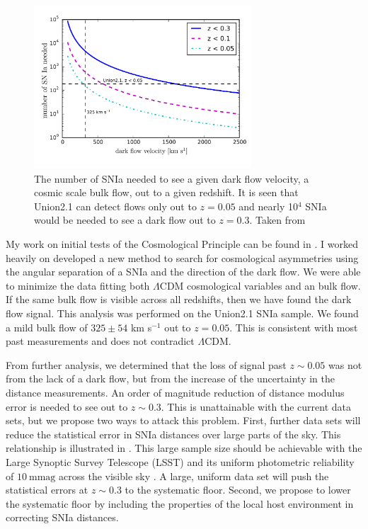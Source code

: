 \documentclass[apj, iop]{emulateapj}
\newcommand{\sn}{SNIa}
\newcommand{\lcdm}{$\Lambda$CDM}     %
\begin{document}
\begin{figure}
	\includegraphics[width=3.2in]{what_dataset_size_v_velocity.pdf} 
    \caption{The number of \sn{} needed to see a given dark flow velocity, a
	cosmic scale bulk flow, out to a given redshift. It is seen that Union2.1 
	can detect flows only out to $z=0.05$ and nearly 10$^4$ \sn{} would be 
	needed to see a dark flow out to $z=0.3$. Taken from \cite{Mathews16}}
	\label{f:sn-needed} 
\end{figure}

My work on initial tests of the Cosmological Principle can be found in
\cite{Mathews16}. I worked heavily on developed a new method to search for
cosmological asymmetries using the angular separation of a \sn{} and the
direction of the dark flow. We were able to minimize the data fitting both
\lcdm{} cosmological variables and  an bulk flow. If the same bulk flow is
visible across all redshifts, then we have found the dark flow signal. This
analysis was performed on the Union2.1 \citep{Suzuki12} \sn{} sample. We found a
mild bulk flow of $325 \pm 54$ km s$^{-1}$ out to $z = 0.05$. This is consistent
with most past measurements and does not contradict \lcdm{}.

From further analysis, we determined that the loss of signal past $z \sim 0.05$
was not from the lack of a dark flow, but from the increase of the uncertainty
in the distance measurements. An order of magnitude reduction of distance
modulus error is needed to see out to $z \sim 0.3$. This is unattainable with
the current data sets, but we propose two ways to attack this problem. First,
further data sets will reduce the statistical error in \sn{} distances over
large parts of the sky. This relationship is illustrated in .
This large sample size should be achievable with the Large Synoptic Survey
Telescope (LSST) and its uniform photometric reliability of $10 ~\text{mmag}$
across the visible sky \citep{Ivezic08}. A large, uniform data set will push the
statistical errors at $z\sim 0.3$ to the systematic floor. Second, we propose to
lower the systematic floor by including the properties of the local host
environment in correcting \sn{} distances.
\end{document}

